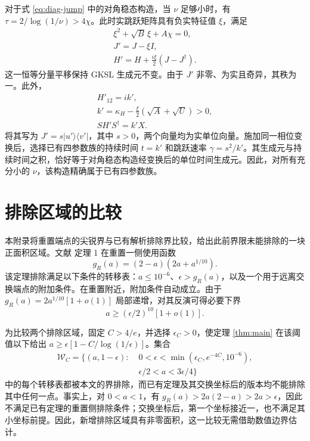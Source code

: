\documentclass[aps,pra,reprint,amsmath,amssymb,nofootinbib,floatfix,longbibliography]{revtex4-2}
\theoremstyle{aps}
\newcommand{\eps}{\epsilon}
\newcommand{\ket}[1]{|#1\rangle}
\newcommand{\bra}[1]{\langle#1|}
\begin{document}
对于式 \eqref{eq:diag-jump} 中的对角稳态构造，当 $\nu$ 足够小时，有 $\tau=2/\log(1/\nu)>4\chi$。此时实跳跃矩阵具有负实特征值 $\xi$，满足
\begin{equation}\label{eq:prior-diag-shift}
 \begin{gathered}
 \xi^2+\sqrt B\,\xi+A\chi=0,\\
 J'=J-\xi I,\\
 H'=H+\frac{i\xi}{2}(J-J^\dagger).
 \end{gathered}
\end{equation}
这一恒等分量平移保持 GKSL 生成元不变。由于 $J'$ 非零、为实且奇异，其秩为一。此外，
\begin{equation}\label{eq:prior-diag-hamiltonian}
 \begin{gathered}
 H'_{12}=ik',\\
 k'=\kappa_H-\frac{\xi}{2}(\sqrt A+\sqrt U)>0,\\
 SH'S^\dagger=k'X.
 \end{gathered}
\end{equation}
将其写为 $J'=s\ket{u'}\bra{v'}$，其中 $s>0$，两个向量均为实单位向量。施加同一相位变换后，选择已有四参数族的持续时间 $t=k'$ 和跳跃速率 $\gamma=s^2/k'$。其生成元与持续时间之积，恰好等于对角稳态构造经变换后的单位时间生成元。因此，对所有充分小的 $\nu$，该构造精确属于已有四参数族。

\section{排除区域的比较}\label{app:exclusions}\label{sec:exclusions}

本附录将重置端点的尖锐界与已有解析排除界比较，给出此前界限未能排除的一块正面积区域。文献 \cite{Shahbeigi2024} 定理 1 在重置一侧使用函数
\begin{equation}\label{eq:oldg}
 g_R(a)=(2-a)(2a+a^{1/10}).
\end{equation}
该定理排除满足以下条件的转移表：$a\le10^{-6}$、$\eps>g_R(a)$，以及一个用于远离交换端点的附加条件。在重置附近，附加条件自动成立。由于
$g_R(a)=2a^{1/10}[1+o(1)]$ 局部递增，对其反演可得必要下界
\begin{equation}\label{eq:oldinverse}
 a\ge(\eps/2)^{10}[1+o(1)].
\end{equation}

为比较两个排除区域，固定 $C>4/e$，并选择 $\eps_C>0$，使定理 \ref{thm:main} 在该阈值以下给出 $a\ge\eps[1-C/\log(1/\eps)]$。集合
\begin{equation}\label{eq:newwedge}
 \begin{split}
 \mathcal W_C=\bigl\{(a,1-\eps):\;&0<\eps<
 \min(\eps_C,e^{-4C},10^{-6}),\\
 &\eps/2<a<3\eps/4\bigr\}
 \end{split}
\end{equation}
中的每个转移表都被本文的界排除，而已有定理及其交换坐标后的版本均不能排除其中任何一点。事实上，对 $0<a<1$，有
$g_R(a)>2a(2-a)>2a>\eps$，因此不满足已有定理的重置侧排除条件；交换坐标后，第一个坐标接近一，也不满足其小坐标前提。因此，新增排除区域具有非零面积，这一比较无需借助数值边界估计。

\clearpage

\end{document}
